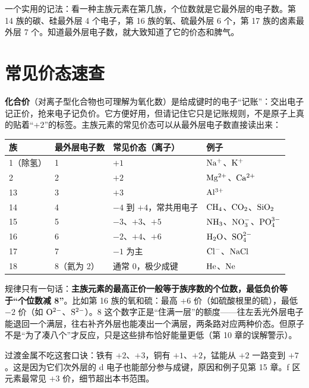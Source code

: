 一个实用的记法：看一种主族元素在第几族，个位数就是它最外层的电子数。第 14 族的碳、硅最外层 4 个电子，第 16 族的氧、硫最外层 6 个，第 17 族的卤素最外层 7 个。知道最外层电子数，就大致知道了它的价态和脾气。

\section{常见价态速查}

\textbf{化合价}（对离子型化合物也可理解为氧化数）是给成键时的电子“记账”：交出电子记正价，抢来电子记负价。它方便好用，但请记住它只是记账规则，不是原子上真的贴着“+2”的标签。主族元素的常见价态可以从最外层电子数直接读出来：

\begin{table}[htbp]
\centering
\begin{tabular}{llll}
\toprule
族 & 最外层电子数 & 常见价态（离子） & 例子 \\
\midrule
1（除氢） & 1 & $+1$ & $\mathrm{Na^+}$、$\mathrm{K^+}$ \\
2 & 2 & $+2$ & $\mathrm{Mg^{2+}}$、$\mathrm{Ca^{2+}}$ \\
13 & 3 & $+3$ & $\mathrm{Al^{3+}}$ \\
14 & 4 & $-4$ 到 $+4$，常共用电子 & $\mathrm{CH_4}$、$\mathrm{CO_2}$、$\mathrm{SiO_2}$ \\
15 & 5 & $-3$、$+3$、$+5$ & $\mathrm{NH_3}$、$\mathrm{NO_3^-}$、$\mathrm{PO_4^{3-}}$ \\
16 & 6 & $-2$、$+4$、$+6$ & $\mathrm{H_2O}$、$\mathrm{SO_4^{2-}}$ \\
17 & 7 & $-1$ 为主 & $\mathrm{Cl^-}$、$\mathrm{NaCl}$ \\
18 & 8（氦为 2） & 通常 0，极少成键 & $\mathrm{He}$、$\mathrm{Ne}$ \\
\bottomrule
\end{tabular}
\end{table}

规律只有一句话：\textbf{主族元素的最高正价一般等于族序数的个位数，最低负价等于“个位数减 8”}。比如第 16 族的氧和硫：最高 $+6$ 价（如硫酸根里的硫），最低 $-2$ 价（如 $\mathrm{O^{2-}}$、$\mathrm{S^{2-}}$）。$8$ 这个数字正是“住满一层”的额度——往左丢光外层电子能退回一个满层，往右补齐外层也能凑出一个满层，两条路对应两种价态。但原子不是“为了凑八个”才反应，只是这些排布恰好能量更低（第 10 章的误解警示）。

过渡金属不吃这套口诀：铁有 $+2$、$+3$，铜有 $+1$、$+2$，锰能从 $+2$ 一路变到 $+7$。这是因为它们次外层的 d 电子也能部分参与成键，原因和例子见第 15 章。f 区元素最常见 $+3$ 价，细节超出本书范围。

